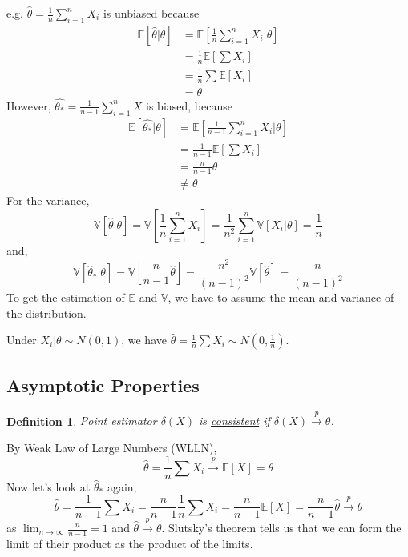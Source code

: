 \documentclass{article}
\newtheorem{definition}{Definition}
\begin{document}
e.g. $\hat{\theta} = \frac{1}{n} \sum_{i=1}^n X_i$ is unbiased because
\begin{align*}
  \mathbb{E}[\hat{\theta}|\theta] & = \mathbb{E}\left[\frac{1}{n} \sum_{i=1}^n X_i|\theta \right] \\
  & = \frac{1}{n} \mathbb{E}\left[\sum X_i \right]\\
  & = \frac{1}{n} \sum \mathbb{E}[X_i]\\
  & = \theta
\end{align*}
However, $\widehat{\theta_{*}} = \frac{1}{n-1} \sum_{i=1}^n X$ is biased, because
\begin{align*}
  \mathbb{E}[\widehat{\theta_{*}}|\theta] & = \mathbb{E}\left[\frac{1}{n-1} \sum_{i=1}^n X_i|\theta \right] \\
  & = \frac{1}{n-1} \mathbb{E}\left[\sum X_i \right]\\
  & = \frac{n}{n-1} \theta\\
  & \neq \theta
\end{align*}
For the variance,
\[ \mathbb{V}[\hat{\theta}|\theta] = \mathbb{V}\left[\frac{1}{n} \sum_{i=1}^n X_i \right] = \frac{1}{n^2} \sum_{i=1}^n \mathbb{V}[X_i|\theta] = \frac{1}{n} \]
and,
\[ \mathbb{V}[\hat{\theta}_{*}|\theta] = \mathbb{V}\left[\frac{n}{n-1} \hat{\theta} \right] = \frac{n^2}{(n-1)^2} \mathbb{V}[\hat{\theta}] = \frac{n}{(n-1)^2} \]
To get the estimation of $\mathbb{E}$ and $\mathbb{V}$, we have to assume the mean and variance of the distribution.

Under $X_i|\theta \sim N(0, 1)$, we have $\hat{\theta} = \frac{1}{n} \sum X_i \sim N\left(0, \frac{1}{n} \right)$.

\subsection{Asymptotic Properties}

\begin{definition}
  Point estimator $\delta(X)$ is \underline{consistent} if $\delta(X) \overset{p}{\rightarrow} \theta$.
\end{definition}

By Weak Law of Large Numbers (WLLN),
\[ \hat{\theta} = \frac{1}{n} \sum X_i \overset{p}{\rightarrow} \mathbb{E}[X] = \theta \]
Now let's look at $\hat{\theta}_{*}$ again,
\[ \hat{\theta} = \frac{1}{n-1} \sum X_i = \frac{n}{n-1} \frac{1}{n} \sum X_i = \frac{n}{n-1} \mathbb{E}[X] = \frac{n}{n-1} \hat{\theta} \overset{p}{\rightarrow} \theta \]
as $\lim_{n \rightarrow \infty} \frac{n}{n-1} = 1$ and $\hat{\theta} \overset{p}{\rightarrow} \theta$. Slutsky's theorem tells us that we can form the limit of their product as the product of the limits.
\end{document}
